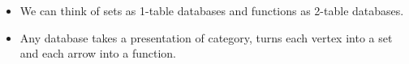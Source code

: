 \begin{itemize}
    \item We can think of sets as 1-table databases and functions as 2-table databases.
    \item Any database takes a presentation of category, turns each vertex into a set and each arrow into a function.
  \end{itemize}
